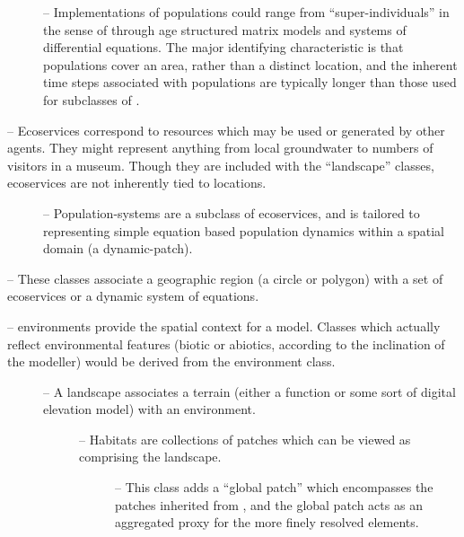 \begin{description}
\begin{description}
\begin{description}
    \item[] -- Implementations of populations
      could range from ``super-individuals'' in the sense of
      \citet{scheffer1995super} through age structured matrix
      models and systems of differential equations. The major 
      identifying characteristic is that populations cover an
      area, rather than a distinct location, and the inherent time
      steps associated with populations are typically longer
      than those used for subclasses of .
    \end{description}

  \item[\TTC{ecoservice}] -- Ecoservices correspond to resources
    which may be used or generated by other agents.  They might
    represent anything from local groundwater to numbers of visitors
    in a museum.  Though they are included with the
    ``landscape'' classes, ecoservices are not inherently tied to
    locations.

    \begin{description}
    \item[] -- Population-systems are a
      subclass of ecoservices, and is tailored to representing
      simple equation based population dynamics within a spatial
      domain (a dynamic-patch).
    \end{description}

  \item[\TTC{patch}, \TTC{dynamic-patch}] -- These classes associate a
    geographic region (a circle or polygon) with a set of
    ecoservices or a dynamic system of equations.

  \item[\TTC{environment}] -- environments provide the spatial context
    for a model.  Classes which actually reflect environmental
    features (biotic or abiotics, according to the inclination of
    the modeller) would be derived from the environment class.

    \begin{description}
    \item[] -- A landscape associates a terrain
      (either a function or some sort of digital elevation model)
      with an environment.
      
      \begin{description}
      \item[] -- Habitats are collections of patches
        which can be viewed as comprising the landscape.
        \begin{description}
        \item[] -- This class adds a ``global patch''
          which encompasses the patches inherited from ,
          and the global patch acts as an aggregated proxy for the
          more finely resolved elements.
        \end{description}
      \end{description}
    \end{description}
  \end{description}
\end{description}


